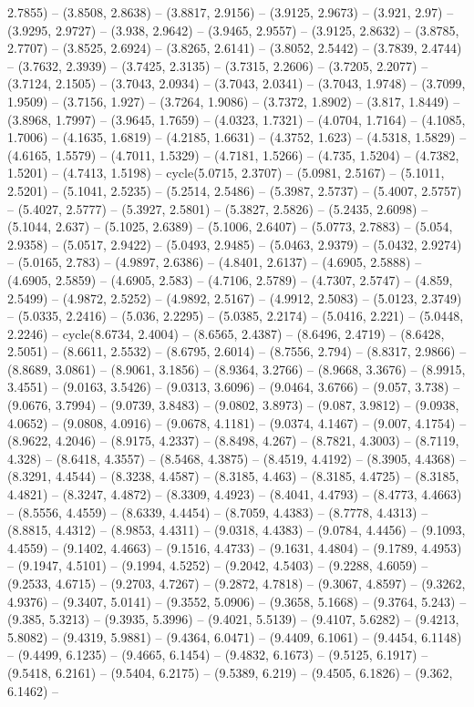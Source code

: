 2.7855) -- (3.8508, 2.8638) -- (3.8817, 2.9156) -- (3.9125, 2.9673) -- (3.921, 2.97) -- (3.9295, 2.9727) -- (3.938, 2.9642) -- (3.9465, 2.9557) -- (3.9125, 2.8632) -- (3.8785, 2.7707) -- (3.8525, 2.6924) -- (3.8265, 2.6141) -- (3.8052, 2.5442) -- (3.7839, 2.4744) -- (3.7632, 2.3939) -- (3.7425, 2.3135) -- (3.7315, 2.2606) -- (3.7205, 2.2077) -- (3.7124, 2.1505) -- (3.7043, 2.0934) -- (3.7043, 2.0341) -- (3.7043, 1.9748) -- (3.7099, 1.9509) -- (3.7156, 1.927) -- (3.7264, 1.9086) -- (3.7372, 1.8902) -- (3.817, 1.8449) -- (3.8968, 1.7997) -- (3.9645, 1.7659) -- (4.0323, 1.7321) -- (4.0704, 1.7164) -- (4.1085, 1.7006) -- (4.1635, 1.6819) -- (4.2185, 1.6631) -- (4.3752, 1.623) -- (4.5318, 1.5829) -- (4.6165, 1.5579) -- (4.7011, 1.5329) -- (4.7181, 1.5266) -- (4.735, 1.5204) -- (4.7382, 1.5201) -- (4.7413, 1.5198) -- cycle(5.0715, 2.3707) -- (5.0981, 2.5167) -- (5.1011, 2.5201) -- (5.1041, 2.5235) -- (5.2514, 2.5486) -- (5.3987, 2.5737) -- (5.4007, 2.5757) -- (5.4027, 2.5777) -- (5.3927, 2.5801) -- (5.3827, 2.5826) -- (5.2435, 2.6098) -- (5.1044, 2.637) -- (5.1025, 2.6389) -- (5.1006, 2.6407) -- (5.0773, 2.7883) -- (5.054, 2.9358) -- (5.0517, 2.9422) -- (5.0493, 2.9485) -- (5.0463, 2.9379) -- (5.0432, 2.9274) -- (5.0165, 2.783) -- (4.9897, 2.6386) -- (4.8401, 2.6137) -- (4.6905, 2.5888) -- (4.6905, 2.5859) -- (4.6905, 2.583) -- (4.7106, 2.5789) -- (4.7307, 2.5747) -- (4.859, 2.5499) -- (4.9872, 2.5252) -- (4.9892, 2.5167) -- (4.9912, 2.5083) -- (5.0123, 2.3749) -- (5.0335, 2.2416) -- (5.036, 2.2295) -- (5.0385, 2.2174) -- (5.0416, 2.221) -- (5.0448, 2.2246) -- cycle(8.6734, 2.4004) -- (8.6565, 2.4387) -- (8.6496, 2.4719) -- (8.6428, 2.5051) -- (8.6611, 2.5532) -- (8.6795, 2.6014) -- (8.7556, 2.794) -- (8.8317, 2.9866) -- (8.8689, 3.0861) -- (8.9061, 3.1856) -- (8.9364, 3.2766) -- (8.9668, 3.3676) -- (8.9915, 3.4551) -- (9.0163, 3.5426) -- (9.0313, 3.6096) -- (9.0464, 3.6766) -- (9.057, 3.738) -- (9.0676, 3.7994) -- (9.0739, 3.8483) -- (9.0802, 3.8973) -- (9.087, 3.9812) -- (9.0938, 4.0652) -- (9.0808, 4.0916) -- (9.0678, 4.1181) -- (9.0374, 4.1467) -- (9.007, 4.1754) -- (8.9622, 4.2046) -- (8.9175, 4.2337) -- (8.8498, 4.267) -- (8.7821, 4.3003) -- (8.7119, 4.328) -- (8.6418, 4.3557) -- (8.5468, 4.3875) -- (8.4519, 4.4192) -- (8.3905, 4.4368) -- (8.3291, 4.4544) -- (8.3238, 4.4587) -- (8.3185, 4.463) -- (8.3185, 4.4725) -- (8.3185, 4.4821) -- (8.3247, 4.4872) -- (8.3309, 4.4923) -- (8.4041, 4.4793) -- (8.4773, 4.4663) -- (8.5556, 4.4559) -- (8.6339, 4.4454) -- (8.7059, 4.4383) -- (8.7778, 4.4313) -- (8.8815, 4.4312) -- (8.9853, 4.4311) -- (9.0318, 4.4383) -- (9.0784, 4.4456) -- (9.1093, 4.4559) -- (9.1402, 4.4663) -- (9.1516, 4.4733) -- (9.1631, 4.4804) -- (9.1789, 4.4953) -- (9.1947, 4.5101) -- (9.1994, 4.5252) -- (9.2042, 4.5403) -- (9.2288, 4.6059) -- (9.2533, 4.6715) -- (9.2703, 4.7267) -- (9.2872, 4.7818) -- (9.3067, 4.8597) -- (9.3262, 4.9376) -- (9.3407, 5.0141) -- (9.3552, 5.0906) -- (9.3658, 5.1668) -- (9.3764, 5.243) -- (9.385, 5.3213) -- (9.3935, 5.3996) -- (9.4021, 5.5139) -- (9.4107, 5.6282) -- (9.4213, 5.8082) -- (9.4319, 5.9881) -- (9.4364, 6.0471) -- (9.4409, 6.1061) -- (9.4454, 6.1148) -- (9.4499, 6.1235) -- (9.4665, 6.1454) -- (9.4832, 6.1673) -- (9.5125, 6.1917) -- (9.5418, 6.2161) -- (9.5404, 6.2175) -- (9.5389, 6.219) -- (9.4505, 6.1826) -- (9.362, 6.1462) -- 